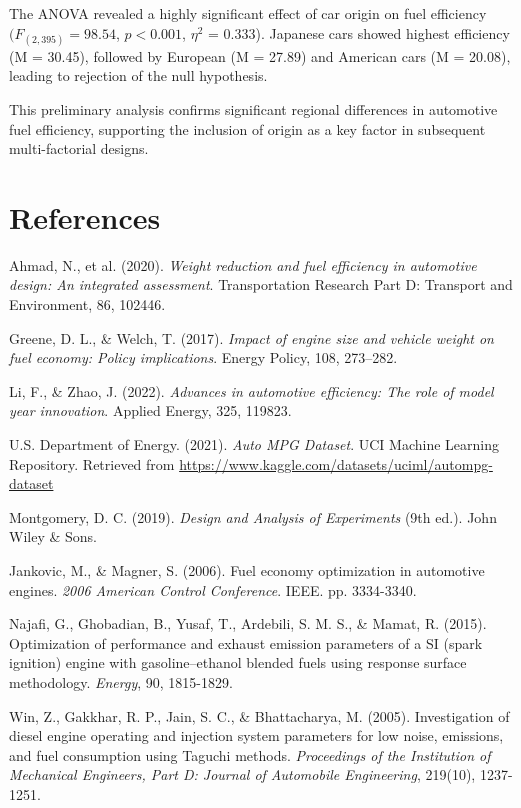 \documentclass[12pt]{article}
\begin{document}
The ANOVA revealed a highly significant effect of car origin on fuel efficiency
\((F_{(2,395)} = 98.54\), \(p < 0.001\), $\eta^2$ = 0.333). Japanese cars showed highest efficiency (M = 30.45), 
followed by European (M = 27.89) and American cars (M = 20.08), leading to rejection of the null hypothesis.

This preliminary analysis confirms significant regional differences in automotive fuel efficiency, supporting 
the inclusion of origin as a key factor in subsequent multi-factorial designs.



\section{References}
\begin{thebibliography}{9}

Ahmad, N., et al. (2020). \textit{Weight reduction and fuel efficiency in automotive design: An integrated assessment}. Transportation Research Part D: Transport and Environment, 86, 102446.

Greene, D. L., \& Welch, T. (2017). \textit{Impact of engine size and vehicle weight on fuel economy: Policy implications}. Energy Policy, 108, 273–282.

Li, F., \& Zhao, J. (2022). \textit{Advances in automotive efficiency: The role of model year innovation}. Applied Energy, 325, 119823.

U.S. Department of Energy. (2021). \textit{Auto MPG Dataset}. 
UCI Machine Learning Repository. Retrieved from \url{https://www.kaggle.com/datasets/uciml/autompg-dataset}

Montgomery, D. C. (2019). \textit{Design and Analysis of Experiments} (9th ed.). John Wiley \& Sons.

Jankovic, M., \& Magner, S. (2006). Fuel economy optimization in automotive engines. \textit{2006 American Control Conference}. IEEE. pp. 3334-3340.

Najafi, G., Ghobadian, B., Yusaf, T., Ardebili, S. M. S., \& Mamat, R. (2015).
Optimization of performance and exhaust emission parameters of a SI (spark ignition) engine with gasoline–ethanol
blended fuels using response surface methodology. \textit{Energy}, 90, 1815-1829.

Win, Z., Gakkhar, R. P., Jain, S. C., \& Bhattacharya, M. (2005).
Investigation of diesel engine operating and injection system parameters for low noise, emissions,
and fuel consumption using Taguchi methods. \textit{Proceedings of the Institution of Mechanical Engineers,
Part D: Journal of Automobile Engineering}, 219(10), 1237-1251.

\end{thebibliography}
\end{document}
